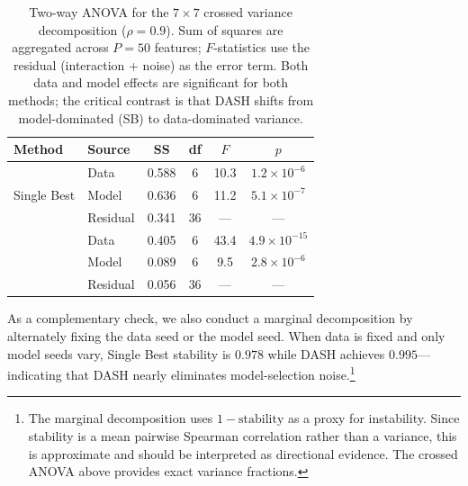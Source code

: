 \documentclass[10pt]{article}
\newcommand{\dash}{\textsc{DASH}}
\newcommand{\rhovar}{\rho}
\begin{document}
\begin{table}[htbp]
\centering
\caption{Two-way ANOVA for the $7 \times 7$ crossed variance
decomposition ($\rhovar = 0.9$). Sum of squares are aggregated across
$P = 50$ features; $F$-statistics use the residual (interaction +
noise) as the error term.\protect\footnotemark{}
Both data and model effects are significant for both
methods; the critical contrast is that \dash{} shifts from
model-dominated (SB) to data-dominated variance.}
\label{tab:anova}
\small
\begin{tabular}{llcccc}
\toprule
\textbf{Method} & \textbf{Source} & \textbf{SS} & \textbf{df} & $F$ & $p$ \\
\midrule
\multirow{3}{*}{Single Best}
  & Data     & 0.588 & 6  & 10.3 & $1.2 \times 10^{-6}$ \\
  & Model    & 0.636 & 6  & 11.2 & $5.1 \times 10^{-7}$ \\
  & Residual & 0.341 & 36 & ---  & --- \\
\addlinespace
\multirow{3}{*}{\dash{} (MaxMin)}
  & Data     & 0.405 & 6  & 43.4 & $4.9 \times 10^{-15}$ \\
  & Model    & 0.089 & 6  & \phantom{0}9.5 & $2.8 \times 10^{-6}$ \\
  & Residual & 0.056 & 36 & ---  & --- \\
\bottomrule
\end{tabular}
\end{table}

As a complementary check, we also conduct a marginal decomposition by
alternately fixing the data seed or the model seed. When data is fixed
and only model seeds vary, Single Best stability is $0.978$ while
\dash{} achieves $0.995$---indicating that \dash{} nearly eliminates
model-selection noise.\footnote{The marginal decomposition uses
$1 - \text{stability}$ as a proxy for instability. Since stability is a
mean pairwise Spearman correlation rather than a variance, this is
approximate and should be interpreted as directional evidence. The
crossed ANOVA above provides exact variance fractions.}
\end{document}

